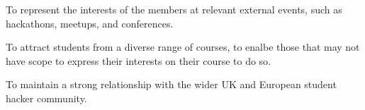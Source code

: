 	\begin{subclause}
		To represent the interests of the members at relevant external events, such as hackathons, meetups, and conferences.
	\end{subclause}
	
	\begin{subclause}
 		To attract students from a diverse range of courses, to enalbe those that may not have scope to express their interests on their course to do so.
	\end{subclause}
	
	\begin{subclause}
 		To maintain a strong relationship with the wider UK and European student hacker community.
	\end{subclause}
